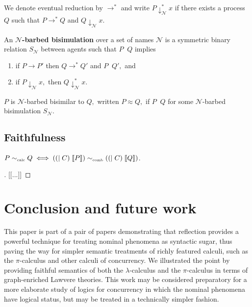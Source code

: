 \documentclass[a4paper,UKenglish]{lipics-v2016}
\newcommand{\Ncal}{\mathcal{N}}
\newcommand{\interp}[1]{\llbracket #1 \rrbracket}
\newcommand{\pic}{$\pi$-calculus}
\begin{document}
We denote eventual reduction by $\to^*$ and write $P \downarrow^*_\Ncal x$ if there exists a process $Q$ such that $P \to^* Q$ and $Q \downarrow_\Ncal x.$

An {\bf $\Ncal$-barbed bisimulation} over a set of names $\Ncal$ is a symmetric binary relation $S_\Ncal$ between agents such that $P \mathop{S_\Ncal} Q$ implies
\begin{enumerate}
  \item if $P \to P'$ then $Q \to^* Q'$ and $P \mathop{S_\Ncal} Q',$ and 
  \item if $P \downarrow_\Ncal x,$ then $Q \downarrow^*_\Ncal x.$
\end{enumerate}
$P$ is $\Ncal$-barbed bisimilar to $Q,$ written $P \approx Q,$ if $P \mathop{S_\Ncal} Q$ for some $\Ncal$-barbed bisimulation $S_\Ncal.$


\subsection{Faithfulness}
\begin{theorem}
  $P \sim_{\mbox{\tiny calc}} Q \iff  ((|\; C)\; \interp{P}) \sim_{\mbox{\tiny comb}} ((|\; C)\; \interp{Q})$.
\end{theorem}

\begin{proof}[]
  [[...]]
\end{proof}
\section{Conclusion and future work}
This paper is part of a pair of papers demonstrating that reflection
provides a powerful technique for treating nominal phenomena as
syntactic sugar, thus paving the way for simpler semantic treatments
of richly featured calculi, such as the {\pic} and other calculi of
concurrency. We illustrated the point by providing faithful semantics
of both the $\lambda$-calculus and the {\pic} in terms of graph-enriched
Lawvere theories. This work may be considered preparatory for a more
elaborate study of logics for concurrency in which the nominal
phenomena have logical status, but may be treated in a technically
simpler fashion.
\end{document}
